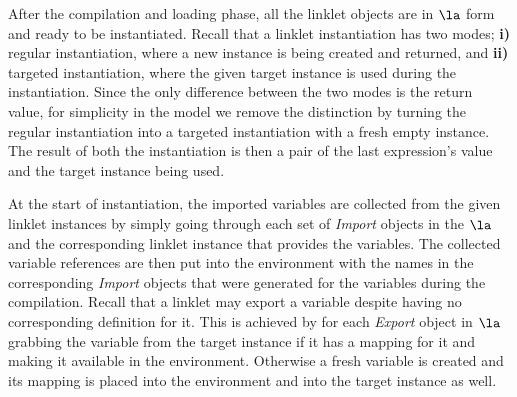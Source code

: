 After the compilation and loading phase, all the linklet objects are
in $\la$ form and ready to be instantiated. Recall that a linklet
instantiation has two modes; \textbf{i)} regular instantiation, where
a new instance is being created and returned, and \textbf{ii)}
targeted instantiation, where the given target instance is used during
the instantiation. Since the only difference between the two modes is
the return value, for simplicity in the model we remove the
distinction by turning the regular instantiation into a targeted
instantiation with a fresh empty instance. The result of both the
instantiation is then a pair of the last expression's value and the
target instance being used.

At the start of instantiation, the imported variables are collected
from the given linklet instances by simply going through each set of
\emph{Import} objects in the $\la$ and the corresponding linklet
instance that provides the variables. The collected variable
references are then put into the environment with the names in the
corresponding \emph{Import} objects that were generated for the
variables during the compilation. Recall that a linklet may export a
variable despite having no corresponding definition for it. This is
achieved by for each \emph{Export} object in $\la$ grabbing the
variable from the target instance if it has a mapping for it and
making it available in the environment. Otherwise a fresh variable is
created and its mapping is placed into the environment and into the
target instance as well.

